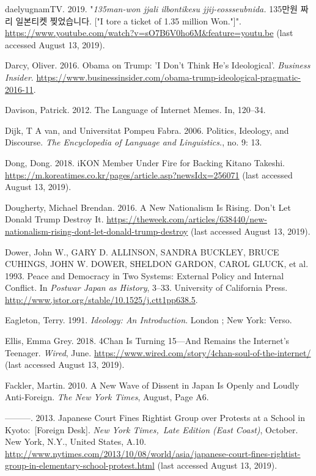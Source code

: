 \documentclass[10pt,british,A4paper,oneside]{memoir}
\begin{document}
\hypertarget{ref-daelyugnamtv_eng._2019}{}
daelyugnamTV. 2019. "\emph{135man-won jjali ilbontikesu jjij-eossseubnida.} 135만원 짜리 일본티켓 찢었습니다. ["I tore a ticket of 1.35 million Won."]".
\url{https://www.youtube.com/watch?v=sO7B6V0ho6M\&feature=youtu.be} (last accessed August 13, 2019).

\hypertarget{ref-darcy_obama_2016}{}
Darcy, Oliver. 2016. Obama on Trump: 'I Don't Think He's Ideological'.
\emph{Business Insider}.
\url{https://www.businessinsider.com/obama-trump-ideological-pragmatic-2016-11}.

\hypertarget{ref-davison_language_2012}{}
Davison, Patrick. 2012. The Language of Internet Memes. In, 120--34.

\hypertarget{ref-van_dijk_politics_2006}{}
Dijk, T A van, and Universitat Pompeu Fabra. 2006. Politics, Ideology,
and Discourse. \emph{The Encyclopedia of Language and Linguistics.}, no.
9: 13.

\hypertarget{ref-dong_ikon_2018}{}
Dong, Dong. 2018. iKON Member Under Fire for Backing Kitano Takeshi.
\url{https://m.koreatimes.co.kr/pages/article.asp?newsIdx=256071} (last accessed August 13, 2019).

\hypertarget{ref-dougherty_new_2016}{}
Dougherty, Michael Brendan. 2016. A New Nationalism Is Rising. Don't Let
Donald Trump Destroy It.
\url{https://theweek.com/articles/638440/new-nationalism-rising-dont-let-donald-trump-destroy} (last accessed August 13, 2019).

\hypertarget{ref-dower_peace_1993}{}
Dower, John W., GARY D. ALLINSON, SANDRA BUCKLEY, BRUCE CUHINGS, JOHN W.
DOWER, SHELDON GARDON, CAROL GLUCK, et al. 1993. Peace and Democracy in
Two Systems: External Policy and Internal Conflict. In \emph{Postwar
Japan as History}, 3--33. University of California Press.
\url{http://www.jstor.org/stable/10.1525/j.ctt1pp638.5}.

\hypertarget{ref-eagleton_ideology:_1991}{}
Eagleton, Terry. 1991. \emph{Ideology: An Introduction}. London ; New
York: Verso.

\hypertarget{ref-ellis_4chan_2018}{}
Ellis, Emma Grey. 2018. 4Chan Is Turning 15---And Remains the Internet's
Teenager. \emph{Wired}, June.
\url{https://www.wired.com/story/4chan-soul-of-the-internet/} (last accessed August 13, 2019).

\hypertarget{ref-fackler_new_2010-1}{}
Fackler, Martin. 2010. A New Wave of Dissent in Japan Is Openly and
Loudly Anti-Foreign. \emph{The New York Times}, August, Page A6.

\hypertarget{ref-fackler_japanese_2013}{}
---------. 2013. Japanese Court Fines Rightist Group over Protests at a
School in Kyoto:~{[}Foreign Desk{]}. \emph{New York Times,~Late Edition
(East Coast)}, October. New York, N.Y., United States, A.10.
\url{http://www.nytimes.com/2013/10/08/world/asia/japanese-court-fines-rightist-group-in-elementary-school-protest.html} (last accessed August 13, 2019).
\end{document}
